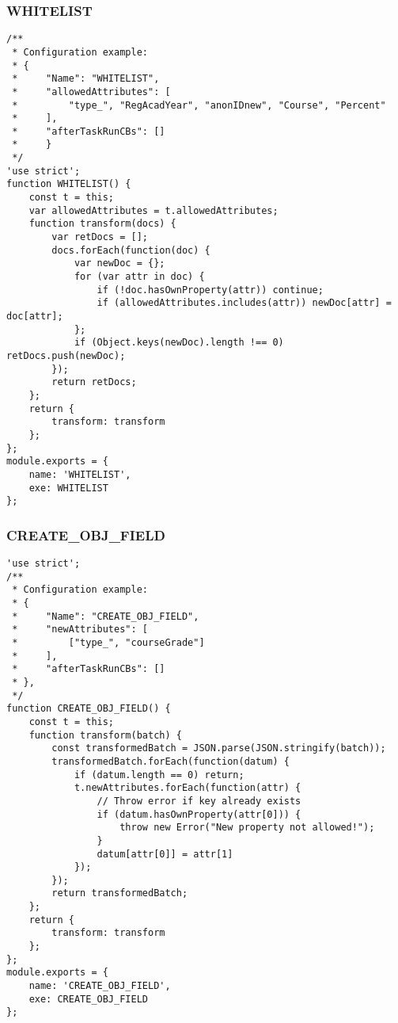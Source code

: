 \subsubsection{WHITELIST}
\label{netl-trans-whitelist}
\begin{verbatim}
/**
 * Configuration example:
 * {
 *     "Name": "WHITELIST",
 *     "allowedAttributes": [
 *         "type_", "RegAcadYear", "anonIDnew", "Course", "Percent"
 *     ],
 *     "afterTaskRunCBs": []
 *     } 
 */
'use strict';
function WHITELIST() {
    const t = this;
    var allowedAttributes = t.allowedAttributes;
    function transform(docs) {
        var retDocs = [];
        docs.forEach(function(doc) {
            var newDoc = {};
            for (var attr in doc) {
                if (!doc.hasOwnProperty(attr)) continue;
                if (allowedAttributes.includes(attr)) newDoc[attr] = doc[attr];
            };
            if (Object.keys(newDoc).length !== 0) retDocs.push(newDoc);
        });
        return retDocs;
    };
    return {
        transform: transform
    };
};
module.exports = {
    name: 'WHITELIST',
    exe: WHITELIST
};
\end{verbatim}

\subsubsection{CREATE\_OBJ\_FIELD}
\label{netl-trans-create-obj-field}
\begin{verbatim}
'use strict';
/**
 * Configuration example:
 * {
 *     "Name": "CREATE_OBJ_FIELD",
 *     "newAttributes": [
 *         ["type_", "courseGrade"]
 *     ],
 *     "afterTaskRunCBs": []
 * },
 */
function CREATE_OBJ_FIELD() {
    const t = this;
    function transform(batch) {
        const transformedBatch = JSON.parse(JSON.stringify(batch));
        transformedBatch.forEach(function(datum) {
            if (datum.length == 0) return;
            t.newAttributes.forEach(function(attr) {
                // Throw error if key already exists
                if (datum.hasOwnProperty(attr[0])) {
                    throw new Error("New property not allowed!");
                }
                datum[attr[0]] = attr[1]
            });
        });
        return transformedBatch;
    };
    return {
        transform: transform
    };
};
module.exports = {
    name: 'CREATE_OBJ_FIELD',
    exe: CREATE_OBJ_FIELD
};
\end{verbatim}